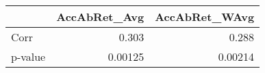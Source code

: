 \begin{tabular}{lrr}
\toprule
 & AccAbRet\_Avg & AccAbRet\_WAvg \\
\midrule
Corr & 0.303 & 0.288 \\
p-value & 0.00125 & 0.00214 \\
\bottomrule
\end{tabular}

